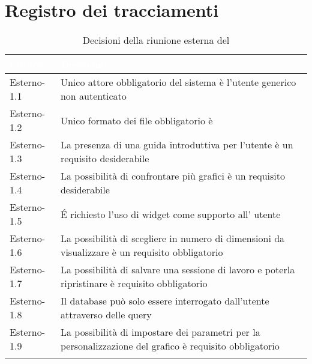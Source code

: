 \section{Registro dei tracciamenti}
{
\renewcommand{\arraystretch}{1.5}
\centering
\begin{longtable}{C{3cm} C{9cm}}
\textcolor{white}{\textbf{Codice}}&
\textcolor{white}{\textbf{Decisione}}\\	
\endhead
		
Esterno-1.1 & Unico attore obbligatorio del sistema è l'utente generico non autenticato\\

Esterno-1.2 & Unico formato dei file obbligatorio è \\

Esterno-1.3 & La presenza di una guida introduttiva per l'utente è un requisito desiderabile\\

Esterno-1.4 & La possibilità di confrontare più grafici è un requisito desiderabile\\

Esterno-1.5 & \'E richiesto l'uso di widget come supporto all' utente\\

Esterno-1.6 & La possibilità di scegliere in numero di dimensioni da visualizzare è un requisito obbligatorio\\

Esterno-1.7 & La possibilità di salvare una sessione di lavoro e poterla ripristinare è requisito obbligatorio\\

Esterno-1.8 & Il database può solo essere interrogato dall'utente attraverso delle query\\

Esterno-1.9 & La possibilità di impostare dei parametri per la personalizzazione del grafico è requisito obbligatorio\\

\caption{Decisioni della riunione esterna del \Data{}}
		
\end{longtable}
}
